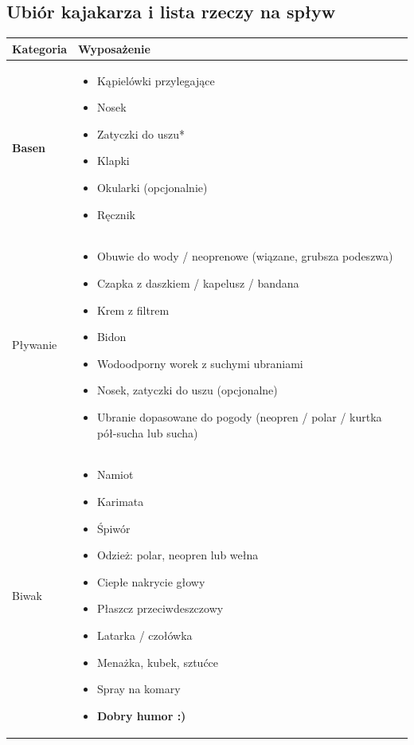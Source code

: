 \subsection{Ubiór kajakarza i lista rzeczy na spływ}

\begin{tabular}{>{\bfseries}p{3cm} p{10cm}}
\toprule
\textbf{Kategoria} & \textbf{Wyposażenie} \\
\midrule

Basen &
\begin{itemize}[leftmargin=*, nosep, topsep=0pt]
  \item Kąpielówki przylegające
  \item Nosek
  \item Zatyczki do uszu*
  \item Klapki
  \item Okularki (opcjonalnie)
  \item Ręcznik
\end{itemize} \\
\midrule

Pływanie &
\begin{itemize}[leftmargin=*, nosep, topsep=0pt]
  \item Obuwie do wody / neoprenowe (wiązane, grubsza podeszwa)
  \item Czapka z daszkiem / kapelusz / bandana
  \item Krem z filtrem
  \item Bidon
  \item Wodoodporny worek z suchymi ubraniami
  \item Nosek, zatyczki do uszu (opcjonalne)
  \item Ubranie dopasowane do pogody (neopren / polar / kurtka pół-sucha lub sucha)
\end{itemize} \\
\midrule

Biwak &
\begin{itemize}[leftmargin=*, nosep, topsep=0pt]
  \item Namiot
  \item Karimata
  \item Śpiwór
  \item Odzież: polar, neopren lub wełna
  \item Ciepłe nakrycie głowy
  \item Płaszcz przeciwdeszczowy
  \item Latarka / czołówka
  \item Menażka, kubek, sztućce
  \item Spray na komary
  \item \textbf{Dobry humor :)}
\end{itemize} \\
\midrule


\end{tabular}

